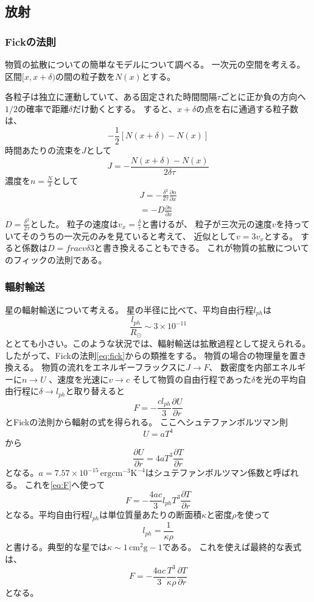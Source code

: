 \documentclass[a4j, dvipdfmx]{jsarticle}
\newcommand{\pder}[2][]{\frac{\partial#1}{\partial#2}}
\newcommand{\half}{\frac{1}{2}}
\newcommand{\beq}{\begin{equation}}
\newcommand{\eeq}{\end{equation}}
\begin{document}
\subsection{放射}
\subsubsection{Fickの法則}
物質の拡散についての簡単なモデルについて調べる。
一次元の空間を考える。区間$[x, x +\delta)$の間の粒子数を$N(x)$とする。
\begin{center}\label{tikz:fick}\end{center}

各粒子は独立に運動していて、ある固定された時間間隔$\tau$ごとに正か負の方向へ$1/2$の確率で距離$\delta$だけ動くとする。
すると、$x+\delta $の点を右に通過する粒子数は、
\beq
- \half \left[N(x + \delta) - N(x)\right]
\eeq
時間あたりの流束を$J$として
\beq
J = - \frac{N(x + \delta) - N(x)}{2\delta \tau}
\eeq
濃度を$n = \frac{N}{\delta}$として
\begin{align}
    J = - \frac{\delta^2}{2\tau} \pder[n]{x}\\
    = - D \pder[n]{x}\label{eq:fick}
\end{align}
$D = \frac{\delta^2}{2\tau}$とした。
粒子の速度は$v_x = \frac{\delta}{\tau}$と書けるが、
粒子が三次元の速度$v$を持っていてそのうちの一次元のみを見ていると考えて、
近似として$v = 3v_x$とする。
すると係数は$D = frac{v\delta}{3}$と書き換えることもできる。
これが物質の拡散についてのフィックの法則である。
\subsubsection{輻射輸送}
星の輻射輸送について考える。
星の半径に比べて、平均自由行程$l_{ph}$は
\beq
\frac{l_{ph}}{R_{\odot}} \sim 3 \times 10^{-11}
\eeq
ととても小さい。このような状況では、輻射輸送は拡散過程として捉えられる。
したがって、Fickの法則\eqref{eq:fick}からの類推をする。
物質の場合の物理量を置き換える。
物質の流れをエネルギーフラックスに$J \rightarrow F$、
数密度を内部エネルギーに$n \rightarrow U$
、速度を光速に$v \rightarrow c$
そして物質の自由行程であった$\delta$を光の平均自由行程に$\delta \rightarrow l_{ph}$と取り替えると
\beq
F = - \frac{c l_{ph}}{3}\pder[U]{r}\label{eq:F}
\eeq
とFickの法則から輻射の式を得られる。
ここへシュテファンボルツマン則
\beq
U = aT^4
\eeq
から
\beq
\pder[U]{r} = 4 aT^3\pder[T]{r}
\eeq
となる。$a=7.57\times10^{-15}\,\mathrm{ergcm^{-3}K^{-4}}$はシュテファンボルツマン係数と呼ばれる。
これを\eqref{eq:F}へ使って
\beq
F = - \frac{4ac}{3} l_{ph}T^3\pder[T]{r}
\eeq
となる。平均自由行程$l_{ph}$は単位質量あたりの断面積$\kappa$と密度$\rho$を使って
\beq
l_{ph} = \frac{1}{\kappa\rho}
\eeq
と書ける。典型的な星では$\kappa \sim 1 \,\mathrm{cm^2g-1}$である。
これを使えば最終的な表式は、
\beq
F =  - \frac{4ac}{3} \frac{T^3}{\kappa\rho}\pder[T]{r}\label{eq:Flast}
\eeq
となる。
\end{document}
